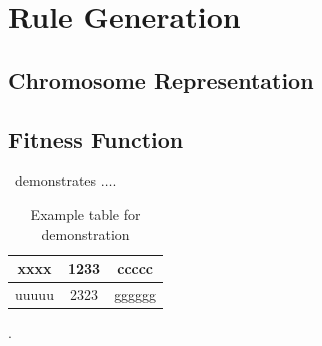 \section{Rule Generation}
\subsection{Chromosome Representation}
\subsection{Fitness Function}


~demonstrates $\ldots$.


\begin{table}
	\label{Table:l1}
	\centering
	\begin{tabular}{|c|c|c|}
		\hline
		xxxx & 1233 & ccccc \\
		\hline
		uuuuu & 2323 & gggggg \\
		\hline
	\end{tabular}
	\caption{Example table for demonstration}
\end{table}

.

\begin{landscape}
\end{landscape}